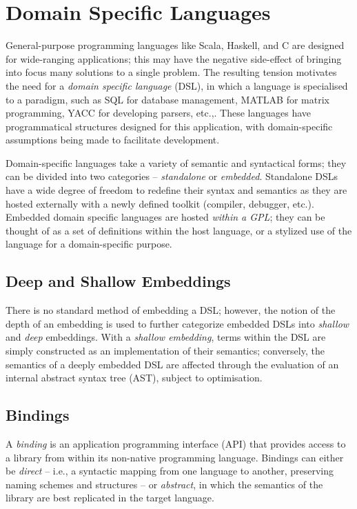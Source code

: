 \documentclass[12pt,twoside]{report}
\begin{document}
\section{Domain Specific Languages} %

General-purpose programming languages like Scala, Haskell, and C are designed for wide-ranging applications; this may have the negative side-effect of bringing into focus many solutions to a single problem. The resulting tension motivates the need for a \textit{domain specific language} (DSL), in which a language is specialised to a paradigm, such as SQL for database management, MATLAB for matrix programming, YACC for developing parsers, etc.,. These languages have programmatical structures designed for this application, with domain-specific assumptions being made to facilitate development.

Domain-specific languages take a variety of semantic and syntactical forms; they can be divided into two categories -- \textit{standalone} or \textit{embedded}. Standalone DSLs have a wide degree of freedom to redefine their syntax and semantics as they are hosted externally with a newly defined toolkit (compiler, debugger, etc.). Embedded domain specific languages are hosted \textit{within a GPL}; they can be thought of as a set of definitions within the host language, or a stylized use of the language for a domain-specific purpose. \autocite{martin_fowler_domain_2010}

\subsection{Deep and Shallow Embeddings}

There is no standard method of embedding a DSL; however, the notion of the depth of an embedding is used to further categorize embedded DSLs into \textit{shallow} and \textit{deep} embeddings. With a \textit{shallow embedding}, terms within the DSL are simply constructed as an implementation of their semantics; conversely, the semantics of a deeply embedded DSL are affected through the evaluation of an internal abstract syntax tree (AST), subject to optimisation. \autocite{gibbons_folding_2014}


\subsection{Bindings}

A \textit{binding} is an application programming interface (API) that provides access to a library from within its non-native programming language. Bindings can either be \textit{direct} -- i.e., a syntactic mapping from one language to another, preserving naming schemes and structures -- or \textit{abstract}, in which the semantics of the library are best replicated in the target language. \autocite{david_emery_standards_2015} 
\end{document}
